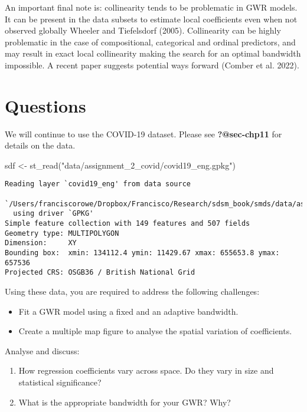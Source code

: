 \documentclass[
  letterpaper,
  krantz2]{style/krantz}
\newenvironment{Shaded}{\begin{snugshade}}{\end{snugshade}}
\newcommand{\FunctionTok}[1]{\textcolor[rgb]{0.28,0.35,0.67}{#1}}
\newcommand{\NormalTok}[1]{\textcolor[rgb]{0.00,0.23,0.31}{#1}}
\newcommand{\OtherTok}[1]{\textcolor[rgb]{0.00,0.23,0.31}{#1}}
\newcommand{\StringTok}[1]{\textcolor[rgb]{0.13,0.47,0.30}{#1}}
\providecommand{\tightlist}{%
  \setlength{\itemsep}{0pt}\setlength{\parskip}{0pt}}\usepackage{longtable,booktabs,array}
\begin{document}
An important final note is: collinearity tends to be problematic in GWR
models. It can be present in the data subsets to estimate local
coefficients even when not observed globally Wheeler and Tiefelsdorf
(2005). Collinearity can be highly problematic in the case of
compositional, categorical and ordinal predictors, and may result in
exact local collinearity making the search for an optimal bandwidth
impossible. A recent paper suggests potential ways forward (Comber et
al. 2022).

\hypertarget{questions-5}{%
\section{Questions}\label{questions-5}}

We will continue to use the COVID-19 dataset. Please see
\textbf{?@sec-chp11} for details on the data.

\begin{Shaded}
\begin{Highlighting}[]
\NormalTok{sdf }\OtherTok{\textless{}{-}} \FunctionTok{st\_read}\NormalTok{(}\StringTok{"data/assignment\_2\_covid/covid19\_eng.gpkg"}\NormalTok{)}
\end{Highlighting}
\end{Shaded}

\begin{verbatim}
Reading layer `covid19_eng' from data source 
  `/Users/franciscorowe/Dropbox/Francisco/Research/sdsm_book/smds/data/assignment_2_covid/covid19_eng.gpkg' 
  using driver `GPKG'
Simple feature collection with 149 features and 507 fields
Geometry type: MULTIPOLYGON
Dimension:     XY
Bounding box:  xmin: 134112.4 ymin: 11429.67 xmax: 655653.8 ymax: 657536
Projected CRS: OSGB36 / British National Grid
\end{verbatim}

Using these data, you are required to address the following challenges:

\begin{itemize}
\item
  Fit a GWR model using a fixed and an adaptive bandwidth.
\item
  Create a multiple map figure to analyse the spatial variation of
  coefficients.
\end{itemize}

Analyse and discuss:

\begin{enumerate}
\def\labelenumi{\arabic{enumi}.}
\tightlist
\item
  How regression coefficients vary across space. Do they vary in size
  and statistical significance?
\item
  What is the appropriate bandwidth for your GWR? Why?
\end{enumerate}
\end{document}
